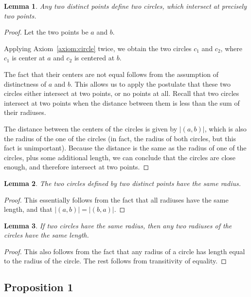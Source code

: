 \documentclass[10pt]{article}
\newtheorem{lemma}{Lemma}
\begin{document}
\begin{lemma}\label{lemma:two-circles}
    Any two distinct points define two circles, which intersect at precisely two points.
\end{lemma}
\begin{proof}
    Let the two points be $a$ and $b$.

    Applying Axiom~\ref{axiom:circle} twice, we obtain the two circles $c_1$ and $c_2$, where $c_1$ is center at $a$ and $c_2$ is centered at $b$.

    The fact that their centers are not equal follows from the assumption of distinctness of $a$ and $b$.
    This allows us to apply the postulate that these two circles either intersect at two points, or no points at all.
    Recall that two circles intersect at two points when the distance between them is less than the sum of their radiuses.

    The distance between the centers of the circles is given by $|(a,b)|$, which is also the radius of the one of the circles (in fact, the radius of both circles, but this fact is unimportant).
    Because the distance is the same as the radius of one of the circles, plus some additional length, we can conclude that the circles are close enough, and therefore intersect at two points.
\end{proof}

\begin{lemma}
    The two circles defined by two distinct points have the same radius.
\end{lemma}
\begin{proof}
    This essentially follows from the fact that all radiuses have the same length, and that $|(a,b)| = |(b,a)|$.
\end{proof}

\begin{lemma}\label{lemma:rad-same}
    If two circles have the same radius, then any two radiuses of the circles have the same length.
\end{lemma}
\begin{proof}
    This also follows from the fact that any radius of a circle has length equal to the radius of the circle.
    The rest follows from transitivity of equality.
\end{proof}

\subsection{Proposition 1}
\end{document}
